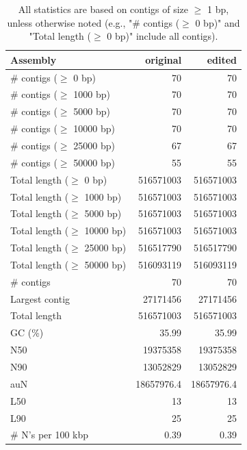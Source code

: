 \documentclass[12pt,a4paper]{article}
\begin{document}
\begin{table}[ht]
\begin{center}
\caption{All statistics are based on contigs of size $\geq$ 1 bp, unless otherwise noted (e.g., "\# contigs ($\geq$ 0 bp)" and "Total length ($\geq$ 0 bp)" include all contigs).}
\begin{tabular}{|l*{2}{|r}|}
\hline
Assembly & original & edited \\ \hline
\# contigs ($\geq$ 0 bp) & 70 & 70 \\ \hline
\# contigs ($\geq$ 1000 bp) & 70 & 70 \\ \hline
\# contigs ($\geq$ 5000 bp) & 70 & 70 \\ \hline
\# contigs ($\geq$ 10000 bp) & 70 & 70 \\ \hline
\# contigs ($\geq$ 25000 bp) & 67 & 67 \\ \hline
\# contigs ($\geq$ 50000 bp) & 55 & 55 \\ \hline
Total length ($\geq$ 0 bp) & 516571003 & 516571003 \\ \hline
Total length ($\geq$ 1000 bp) & 516571003 & 516571003 \\ \hline
Total length ($\geq$ 5000 bp) & 516571003 & 516571003 \\ \hline
Total length ($\geq$ 10000 bp) & 516571003 & 516571003 \\ \hline
Total length ($\geq$ 25000 bp) & 516517790 & 516517790 \\ \hline
Total length ($\geq$ 50000 bp) & 516093119 & 516093119 \\ \hline
\# contigs & 70 & 70 \\ \hline
Largest contig & 27171456 & 27171456 \\ \hline
Total length & 516571003 & 516571003 \\ \hline
GC (\%) & 35.99 & 35.99 \\ \hline
N50 & 19375358 & 19375358 \\ \hline
N90 & 13052829 & 13052829 \\ \hline
auN & 18657976.4 & 18657976.4 \\ \hline
L50 & 13 & 13 \\ \hline
L90 & 25 & 25 \\ \hline
\# N's per 100 kbp & 0.39 & 0.39 \\ \hline
\end{tabular}
\end{center}
\end{table}
\end{document}

